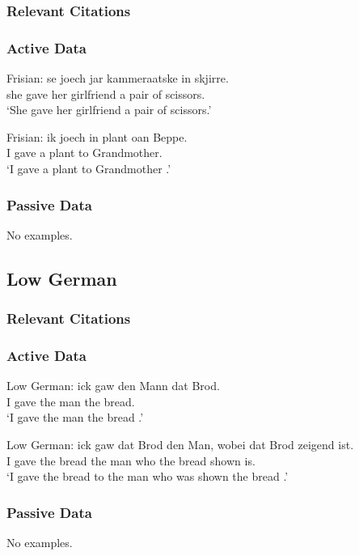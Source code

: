 \subsubsection{Relevant Citations}
\subsubsection{Active Data}
\begin{exe}
	 Frisian:
		\gll se joech jar kammeraatske in skjirre.\\
		she gave her girlfriend a {pair of scissors}.\\
		\trans `She gave her girlfriend a pair of scissors.'

	 Frisian:
		\gll ik joech in plant oan Beppe.\\
		I gave a plant to Grandmother.\\
		\trans `I gave a plant to Grandmother \citep{Tiersma.1985}.'

\end{exe}
\subsubsection{Passive Data}
No examples.

\subsection{Low German}
\subsubsection{Relevant Citations}
\subsubsection{Active Data}
\begin{exe}
	 Low German:
		\gll ick gaw den Mann dat Brod.\\
		I gave the man the bread.\\
		\trans `I gave the man the bread \citep{Mussaus.1829}.'

	 Low German:
		\gll ick gaw dat Brod den Man, wobei dat Brod zeigend ist.\\
		I gave the bread the man who the bread shown is.\\
		\trans `I gave the bread to the man who was shown the bread \citep{Mussaus.1829}.'
\end{exe}
\subsubsection{Passive Data}
No examples.

